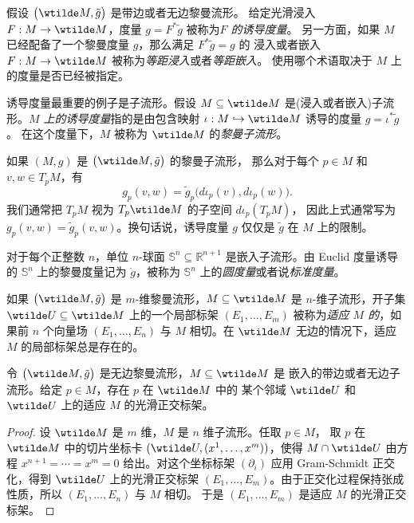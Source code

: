 假设 $\bigl(\wtilde M,\tilde g\bigr)$ 是带边或者无边黎曼流形。
给定光滑浸入 $F:M\to\wtilde M$，度量 $g=F^*\tilde g$ 被称为\emph{$F$ 的诱导度量}。
另一方面，如果 $M$ 已经配备了一个黎曼度量 $g$，那么满足 $F^*\tilde g=g$ 的
浸入或者嵌入 $F:M\to\wtilde M$ 被称为\emph{等距浸入}或者\emph{等距嵌入}。
使用哪个术语取决于 $M$ 上的度量是否已经被指定。

诱导度量最重要的例子是子流形。假设 $M\subseteq \wtilde M$
是(浸入或者嵌入)子流形。\emph{$M$ 上的诱导度量}指的是由包含映射
$\iota:M\hookrightarrow\wtilde M$ 诱导的度量 $g=\iota^*\tilde g$。
在这个度量下，$M$ 被称为 $\wtilde M$ 的\emph{黎曼子流形}。

如果 $(M,g)$ 是 $\bigl(\wtilde M,\tilde g\bigr)$ 的黎曼子流形，
那么对于每个 $p\in M$ 和 $v,w\in T_pM$，有
\[
  g_p(v,w)=\tilde g_p\bigl(d\iota_p(v),d\iota_p(w)\bigr).
\]
我们通常把 $T_pM$ 视为 $T_p\wtilde M$ 的子空间 $d\iota_p(T_pM)$，
因此上式通常写为 $g_p(v,w)=\tilde g_p(v,w)$。换句话说，诱导度量
$g$ 仅仅是 $\tilde g$ 在 $M$ 上的限制。

\begin{example}[球面]
  对于每个正整数 $n$，单位 $n$-球面 $\mathbb{S}^n\subseteq \mathbb{R}^{n+1}$
  是嵌入子流形。由 Euclid 度量诱导的 $\mathbb{S}^n$ 上的黎曼度量记为
  $\mathring g$，被称为 $\mathbb{S}^n$ 上的\emph{圆度量}或者说\emph{标准度量}。
\end{example}

如果 $\bigl(\wtilde M,\tilde g\bigr)$ 是 $m$-维黎曼流形，$M\subseteq \wtilde M$
是 $n$-维子流形，开子集 $\wtilde U\subseteq \wtilde M$ 上的一个局部标架
$(E_1,\dots,E_m)$ 被称为\emph{适应 $M$ 的}，如果前 $n$ 个向量场 $(E_1,\dots,E_n)$ 
与 $M$ 相切。在 $\wtilde M$ 无边的情况下，适应 $M$ 的局部标架总是存在的。

\begin{proposition}[适应正交标架的存在性]\label{prop:adapted orthonormal frame}
  令 $\bigl(\wtilde M,\tilde g\bigr)$ 是无边黎曼流形，$M\subseteq \wtilde M$ 是
  嵌入的带边或者无边子流形。给定 $p\in M$，存在 $p$ 在 $\wtilde M$ 中的
  某个邻域 $\wtilde U$ 和 $\wtilde U$ 上的适应 $M$ 的光滑正交标架。
\end{proposition}
\begin{proof}
  设 $\wtilde M$ 是 $m$ 维，$M$ 是 $n$ 维子流形。任取 $p\in M$，
  取 $p$ 在 $\wtilde M$ 中的切片坐标卡 $(\wtilde U,(x^1,\dots,x^m))$，使得
  $M\cap \wtilde U$ 由方程 $x^{n+1}=\cdots=x^m=0$ 给出。对这个坐标标架
  $(\partial_i)$ 应用 Gram-Schmidt 正交化，得到 $\wtilde U$ 上的光滑正交标架
  $(E_1,\dots,E_m)$。由于正交化过程保持张成性质，所以 $(E_1,\dots,E_n)$ 与 $M$ 相切。
  于是 $(E_1,\dots,E_m)$ 是适应 $M$ 的光滑正交标架。
\end{proof}

